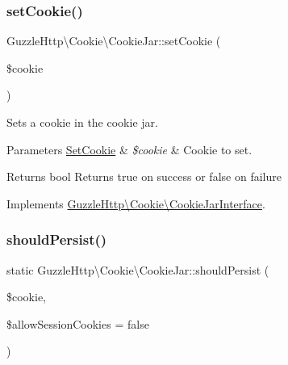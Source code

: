 \subsubsection{\texorpdfstring{set\+Cookie()}{setCookie()}}
{\footnotesize\ttfamily Guzzle\+Http\textbackslash{}\+Cookie\textbackslash{}\+Cookie\+Jar\+::set\+Cookie (\begin{DoxyParamCaption}\item[{\hyperlink{classGuzzleHttp_1_1Cookie_1_1SetCookie}{Set\+Cookie}}]{\$cookie }\end{DoxyParamCaption})}

Sets a cookie in the cookie jar.


\begin{DoxyParams}[1]{Parameters}
\hyperlink{classGuzzleHttp_1_1Cookie_1_1SetCookie}{Set\+Cookie} & {\em \$cookie} & Cookie to set.\\
\hline
\end{DoxyParams}
\begin{DoxyReturn}{Returns}
bool Returns true on success or false on failure 
\end{DoxyReturn}


Implements \hyperlink{interfaceGuzzleHttp_1_1Cookie_1_1CookieJarInterface_a9e9225852ba0caa3f0c241d49167f8bf}{Guzzle\+Http\textbackslash{}\+Cookie\textbackslash{}\+Cookie\+Jar\+Interface}.

\mbox{\label{classGuzzleHttp_1_1Cookie_1_1CookieJar_a0d462d85e5bb53da6b8a8654d5d4db28}} 
\subsubsection{\texorpdfstring{should\+Persist()}{shouldPersist()}}
{\footnotesize\ttfamily static Guzzle\+Http\textbackslash{}\+Cookie\textbackslash{}\+Cookie\+Jar\+::should\+Persist (\begin{DoxyParamCaption}\item[{\hyperlink{classGuzzleHttp_1_1Cookie_1_1SetCookie}{Set\+Cookie}}]{\$cookie,  }\item[{}]{\$allow\+Session\+Cookies = {\ttfamily false} }\end{DoxyParamCaption})\hspace{0.3cm}{\ttfamily [static]}}

